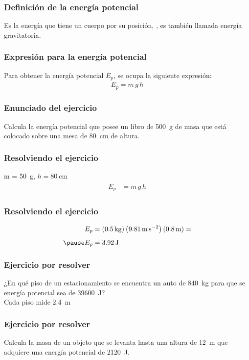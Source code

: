 \documentclass[14pt]{beamer}
\begin{document}
\begin{frame}
\frametitle{Definición de la energía potencial}
Es la energía que tiene un cuerpo por su posición, , es también llamada energía gravitatoria.
\end{frame}
\begin{frame}
\frametitle{Expresión para la energía potencial}
Para obtener la energía potencial $E_{p}$, se ocupa la siguiente expresión:
\pause
\begin{align*}
E_{p} = m \, g \, h
\end{align*}
\end{frame}
\begin{frame}
\frametitle{Enunciado del ejercicio}
Calcula la energía potencial que posee un libro de \SI{500}{\gram} de masa que está colocado sobre una mesa de \SI{80}{\centi\meter} de altura.
\end{frame}
\begin{frame}
\frametitle{Resolviendo el ejercicio}
 \pause m = \SI{50}{\gram}, \pause $h = \SI{80}{\centi\meter}$
\\
\bigskip
\pause
{}
\begin{eqnarray*}
\begin{aligned}
E_{p} &= m \, g \, h
\end{aligned}
\end{eqnarray*}
\end{frame}
\begin{frame}
\frametitle{Resolviendo el ejercicio}
\pause
\begin{eqnarray*}
\begin{aligned}
E_{p} &= (\SI{0.5}{\kilo\gram}) \left( \SI{9.81}{\meter\per\square\second} \right) (\SI{0.8}{\meter}) = \\[0.5em] \pause
E_{p} &= \SI{3.92}{\joule}
\end{aligned}
\end{eqnarray*}
\end{frame}
\begin{frame}
\frametitle{Ejercicio por resolver}
¿En qué piso de un estacionamiento se encuentra un auto de \SI{840}{\kilo\gram} para que se energía potencial sea de \SI{39600}{\joule}?
\\
\bigskip
Cada piso mide \SI{2.4}{\meter}
\end{frame}
\begin{frame}
\frametitle{Ejercicio por resolver}
Calcula la masa de un objeto que se levanta hasta una altura de \SI{12}{\meter} que adquiere una energía potencial de \SI{2120}{\joule}.
\end{frame}
\end{document}

